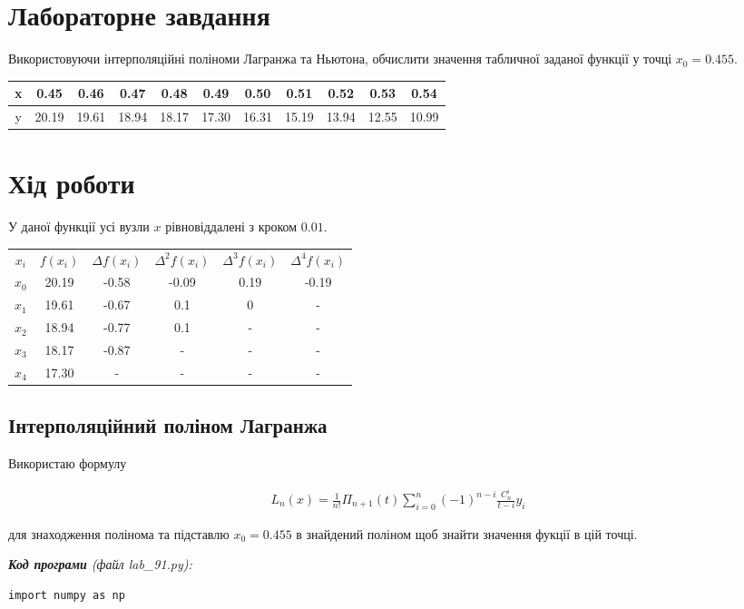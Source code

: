 \documentclass{article}
\newcommand\lab{9}
\begin{document}
\begin{large}
		\section*{Лабораторне завдання}
		Використовуючи інтерполяційні поліноми Лагранжа та Ньютона,
		обчислити значення табличної заданої функції у точці $x_0 = 0.455$.
		\vspace{5pt}
		
		\begin{tabular}{|c|c|c|c|c|c|c|c|c|c|c|}
			\hline
			x & 0.45 & 0.46 & 0.47 & 0.48 & 0.49 & 0.50 & 0.51 & 0.52 & 0.53 & 0.54 \\
			\hline
			y & 20.19 & 19.61 & 18.94 & 18.17 & 17.30 & 16.31 & 15.19 & 13.94 & 12.55 & 10.99\\
			\hline
		\end{tabular}
	
		\section*{Хід роботи}
		У даної функції усі вузли $x$ рівновіддалені з кроком $0.01$.
		
		\begin{tabular}{|c|c|c|c|c|c|}
			\hline
			$x_i$ & $f(x_i)$ & $\varDelta f(x_i)$ & $\varDelta^2 f(x_i)$ & $\varDelta^3 f(x_i)$ & $\varDelta^4 f(x_i)$ \\
			$x_0$ & 20.19 & -0.58 & -0.09 & 0.19 & -0.19\\
			$x_1$ & 19.61 & -0.67 & 0.1  & 0 & -\\
			$x_2$ & 18.94 & -0.77 & 0.1 & - & -\\
			$x_3$ & 18.17 & -0.87 & - & - & -\\
			$x_4$ & 17.30 & - & - & - & -\\
			\hline
		\end{tabular}
		
		\subsection*{Інтерполяційний поліном Лагранжа}
		Використаю формулу
		
		\begin{gather}
			L_n(x)=\frac{1}{n!}\Pi_{n+1}(t)\sum_{i=0}^{n}(-1)^{n-i}\frac{C_n^i}{t-i}y_i\nonumber
		\end{gather}
	
		для знаходження полінома та підставлю $x_0=0.455$ в знайдений поліном щоб знайти значення фукції в цій точці.
			
		\noindent\textit{\textbf{Код програми} (файл lab\_\lab1.py):}
		\begin{lstlisting}
import numpy as np


\end{lstlisting}
\end{large}
\end{document}
